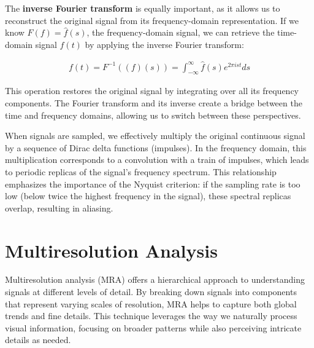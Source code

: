 The \textbf{inverse Fourier transform} is equally important, as it allows us to reconstruct the original signal from its frequency-domain representation. If we know \( F(f) = \hat{f}(s) \), the frequency-domain signal, we can retrieve the time-domain signal \( f(t) \) by applying the inverse Fourier transform:

\begin{align}
  f(t) = F^{-1}((f)(s)) = \int_{-\infty}^{\infty} \hat{f}(s) e^{2\pi i s t} ds  
\end{align}


This operation restores the original signal by integrating over all its frequency components. The Fourier transform and its inverse create a bridge between the time and frequency domains, allowing us to switch between these perspectives.


When signals are sampled, we effectively multiply the original continuous signal by a sequence of Dirac delta functions (impulses). In the frequency domain, this multiplication corresponds to a convolution with a train of impulses, which leads to periodic replicas of the signal's frequency spectrum. This relationship emphasizes the importance of the Nyquist criterion: if the sampling rate is too low (below twice the highest frequency in the signal), these spectral replicas overlap, resulting in aliasing. 

\section{Multiresolution Analysis}

Multiresolution analysis (MRA) offers a hierarchical approach to understanding signals at different levels of detail. By breaking down signals into components that represent varying scales of resolution, MRA helps to capture both global trends and fine details. This technique leverages the way we naturally process visual information, focusing on broader patterns while also perceiving intricate details as needed.


